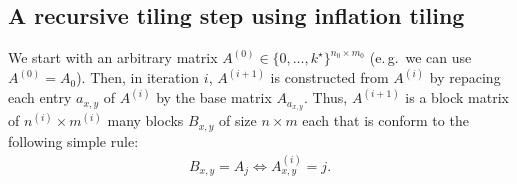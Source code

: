 \documentclass[a4paper,11pt]{article}
\theoremstyle{mystyle}
\newcommand{\eg}{e.\,g.\ }
\begin{document}
\subsection{A recursive tiling step using inflation tiling}
We start with an arbitrary matrix $A^{(0)} \in \{0, \dots, k^\star\}^{n_0 \times m_0}$ (\eg we can use $A^{(0)} = A_0$).
Then, in iteration $i$, $A^{(i+1)}$ is constructed from $A^{(i)}$ by repacing each entry $a_{x,y}$ of $A^{(i)}$ by the base matrix $A_{a_{x,y}}$.
Thus, $A^{(i+1)}$ is a block matrix of $n^{(i)} \times m^{(i)}$ many blocks $B_{x,y}$ of size $n \times m$ each that is conform to the following simple rule:
\begin{align*}
	B_{x,y} = A_j \Leftrightarrow A^{(i)}_{x,y} = j.
\end{align*}
\end{document}
